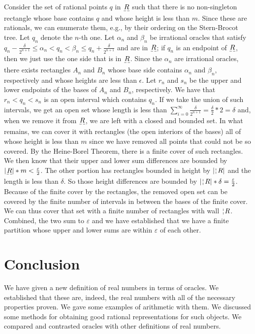 \documentclass[12pt]{article}
\begin{document}
Consider the set of rational points $q$ in $\base{R}$ such that there is no non-singleton rectangle whose base contains $q$ and whose height is less than $m$. Since these are rationals, we can enumerate them, e.g.,  by their ordering on the Stern-Brocot tree. Let $q_n$ denote the $n$-th one. Let $\alpha_n$ and $\beta_n$ be irrational oracles that satisfy $q_n - \frac{\delta}{2^{n+1}} \leq \alpha_n < q_n < \beta_n \leq q_n + \frac{\delta}{2^{n+1}}$ and are in $\base{R}$; if $q_n$ is an endpoint of $\base{R}$, then we just use the one side that is in $\base{R}$. Since the $\alpha_n$ are irrational oracles, there exists rectangles $A_n$ and $B_n$ whose base side contains $\alpha_n$ and $\beta_n$, respectively and whose heights are less than $\epsilon$. Let $r_n$ and $s_n$ be the upper and lower endpoints of the bases of $A_n$ and $B_n$, respectively. We have that $r_n < q_n < s_n$ is an open interval which contains $q_n$. If we take the union of such intervals, we get an open set whose length is less than $\sum_{i=0}^\infty \frac{\delta}{2^{n+1}} = \frac{\delta}{2} * 2 = \delta$ and, when we remove it from $\base{R}$, we are left with a closed and bounded set. In what remains, we can cover it with rectangles (the open interiors of the bases) all of whose height is less than $m$ since we have removed all points that could not be so covered. By the Heine-Borel Theorem, there is a finite cover of such rectangles. We then know that their upper and lower sum differences are bounded by $|\base{R}|*m < \frac{\varepsilon}{2}$. The other portion has rectangles bounded in height by $|\wall{R}|$ and the length is less than $\delta$. So those height differences are bounded by $|\wall{R}|*\delta = \frac{\varepsilon}{2}$. Because of the finite cover by the rectangles, the removed open set can be covered by the finite number of intervals in between the bases of the finite cover. We can thus cover that set with a finite number of rectangles with wall $\wall{R}$. Combined, the two sum to $\varepsilon$ and we have established that we have a finite partition whose upper and lower sums are within $\varepsilon$ of each other. 




\section{Conclusion}





We have given a new definition of real numbers in terms of oracles. We established that these are, indeed, the real numbers with all of the necessary properties proven. We gave some examples of arithmetic with them. We discussed some methods for obtaining good rational representations for such objects.  We compared and contrasted oracles with other definitions of real numbers. 
\end{document}

